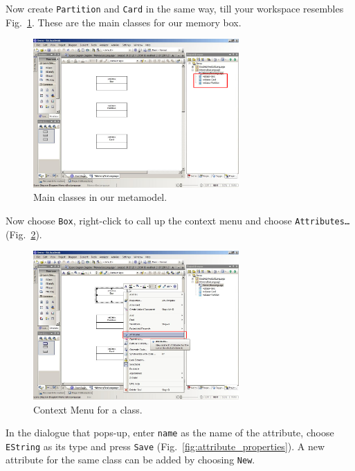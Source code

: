Now create \texttt{Partition} and \texttt{Card} in the same way, till your
workspace resembles Fig.~\ref{fig:all_eclasses}.  These are the main classes for
our memory box.

\begin{figure}[htbp]
	\centering
  \includegraphics[width=0.7\textwidth]{pics/memBox10.png}
	\caption{Main classes in our metamodel.}
	\label{fig:all_eclasses}
\end{figure}

Now choose \texttt{Box}, right-click to call up the context menu and choose
\texttt{Att\-ri\-butes\ldots} (Fig.~\ref{fig:attribute}).

\begin{figure}[htbp]
	\centering
  \includegraphics[width=0.7\textwidth]{pics/memBox11.png}
	\caption{Context Menu for a class.}
	\label{fig:attribute}
\end{figure}

\clearpage

In the dialogue that pops-up, enter \texttt{name} as the name of the attribute,
choose \texttt{EString} as its type and press \texttt{Save}
(Fig.~\ref{fig:attribute_properties}).  A new attribute for the same class can
be added by choosing \texttt{New}.

